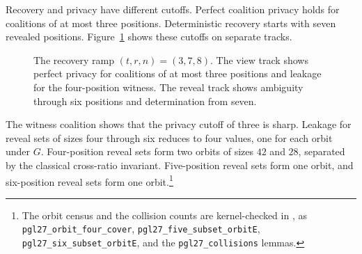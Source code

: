 \documentclass[runningheads]{llncs}
\newcommand{\coqin}[1]{\texttt{#1}}
\begin{document}
Recovery and privacy have different cutoffs. Perfect coalition privacy holds
for coalitions of at most three positions. Deterministic recovery starts with
seven revealed positions. Figure~\ref{fig:ramp} shows these cutoffs on
separate tracks.

\begin{figure}[t]
  \centering
  \caption{The recovery ramp $(t,r,n)=(3,7,8)$. The view track shows perfect privacy for
coalitions of at most three positions and leakage for the four-position
witness. The reveal track shows ambiguity through six positions and
determination from seven.}
  \label{fig:ramp}
\end{figure}

The witness coalition shows that the privacy cutoff of three is sharp. Leakage
for reveal sets of sizes four through six reduces to four values, one for each
orbit under $G$. Four-position reveal sets form two orbits of sizes $42$ and
$28$, separated by the classical cross-ratio invariant. Five-position reveal
sets form one orbit, and six-position reveal sets form one orbit.\footnote{The orbit census and the collision counts are kernel-checked
in , as
\coqin{pgl27\_orbit\_four\_cover}, \coqin{pgl27\_five\_subset\_orbitE},
\coqin{pgl27\_six\_subset\_orbitE}, and the \coqin{pgl27\_collisions}
lemmas.}
\end{document}
